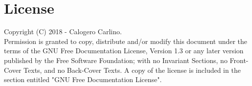 \chapter{License} %

\label{Copyright} %

    Copyright (C)  2018 - Calogero Carlino.\\
    Permission is granted to copy, distribute and/or modify this document
    under the terms of the GNU Free Documentation License, Version 1.3
    or any later version published by the Free Software Foundation;
    with no Invariant Sections, no Front-Cover Texts, and no Back-Cover Texts.
    A copy of the license is included in the section entitled "GNU
    Free Documentation License".
